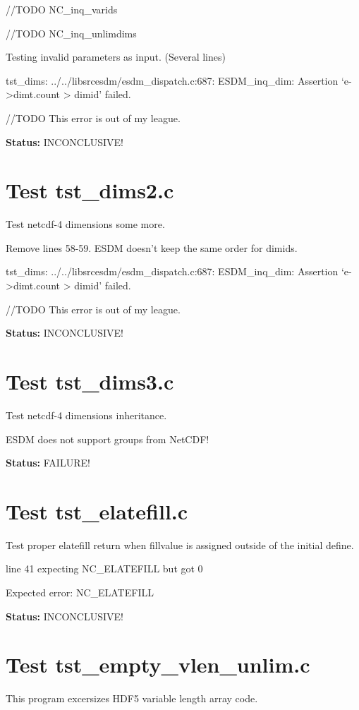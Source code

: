 //TODO NC\_inq\_varids

//TODO NC\_inq\_unlimdims

Testing invalid parameters as input. (Several lines)

tst\_dims: ../../libsrcesdm/esdm\_dispatch.c:687: ESDM\_inq\_dim: Assertion `e->dimt.count > dimid' failed.

//TODO This error is out of my league.

{\bf \large Status: } INCONCLUSIVE!

\section{Test tst\_dims2.c}

Test netcdf-4 dimensions some more.

Remove lines 58-59. ESDM doesn't keep the same order for dimids.

tst\_dims: ../../libsrcesdm/esdm\_dispatch.c:687: ESDM\_inq\_dim: Assertion `e->dimt.count > dimid' failed.

//TODO This error is out of my league.

{\bf \large Status: } INCONCLUSIVE!

\section{Test tst\_dims3.c}

Test netcdf-4 dimensions inheritance.

ESDM does not support groups from NetCDF!

{\bf \large Status: } FAILURE!

\section{Test tst\_elatefill.c}

Test proper elatefill return when fillvalue is assigned outside of
the initial define.

line 41 expecting NC\_ELATEFILL but got 0

Expected error: NC\_ELATEFILL

{\bf \large Status: } INCONCLUSIVE!

\section{Test tst\_empty\_vlen\_unlim.c}

This program excersizes HDF5 variable length array code.

